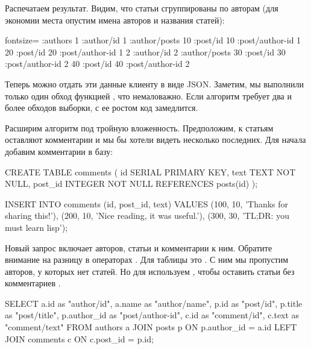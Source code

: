 Распечатаем результат. Видим, что статьи сгруппированы по авторам (для экономии места опустим имена авторов и названия статей):

\begin{english}
  \begin{clojure*}{fontsize=\small}
{:authors
 {1 {:author/id 1
     :author/posts
     {10 {:post/id 10
          :post/author-id 1}
      20 {:post/id 20
          :post/author-id 1}}}
  2 {:author/id 2
     :author/posts
     {30 {:post/id 30
          :post/author-id 2}
      40 {:post/id 40
          :post/author-id 2}}}}}
  \end{clojure*}
\end{english}


Теперь можно отдать эти данные клиенту в виде JSON. Заметим, мы выполнили только один обход функцией , что немаловажно. Если алгоритм требует два и более обходов выборки, с ее ростом код замедлится.

Расширим алгоритм под тройную вложенность. Предположим, к статьям оставляют комментарии и мы бы хотели видеть несколько последних. Для начала добавим комментарии в базу:

\begin{english}
  \begin{sql}
CREATE TABLE comments (
  id SERIAL PRIMARY KEY,
  text TEXT NOT NULL,
  post_id INTEGER NOT NULL REFERENCES posts(id)
);

INSERT INTO
  comments (id, post_id, text)
VALUES
  (100, 10, 'Thanks for sharing this!'),
  (200, 10, 'Nice reading, it was useful.'),
  (300, 30, 'TL;DR: you must learn lisp');
  \end{sql}
\end{english}

Новый запрос включает авторов, статьи и комментарии к ним. Обратите внимание на разницу в операторах . Для таблицы  это  . С ним мы пропустим авторов, у которых нет статей. Но для  используем , чтобы оставить статьи без комментариев .

\begin{english}
  \begin{sql/lines}
SELECT
  a.id        as "author/id",
  a.name      as "author/name",
  p.id        as "post/id",
  p.title     as "post/title",
  p.author_id as "post/author-id",
  c.id        as "comment/id",
  c.text      as "comment/text"
FROM authors a
JOIN posts p ON p.author_id = a.id
LEFT JOIN comments c ON c.post_id = p.id;
  \end{sql/lines}
\end{english}

